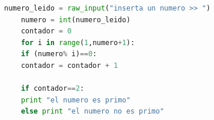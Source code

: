 \documentclass[]{beamer}
\begin{document}
\begin{frame}[fragile]
	\begin{lstlisting}[language=Python, 
	basicstyle=\ttfamily\small, 
	keywordstyle=\color{keywords},
	commentstyle=\color{comments},
	stringstyle=\color{red},
	showstringspaces=false,
	identifierstyle=\color{green},caption= 
	loops, basicstyle=\tiny]
	numero_leido = raw_input("inserta un numero >> ")
	numero = int(numero_leido)
	contador = 0
	for i in range(1,numero+1):
	if (numero% i)==0:
	contador = contador + 1
	
	if contador==2:
	print "el numero es primo"
	else print "el numero no es primo"
	\end{lstlisting}
\end{frame}

	
\end{document}
